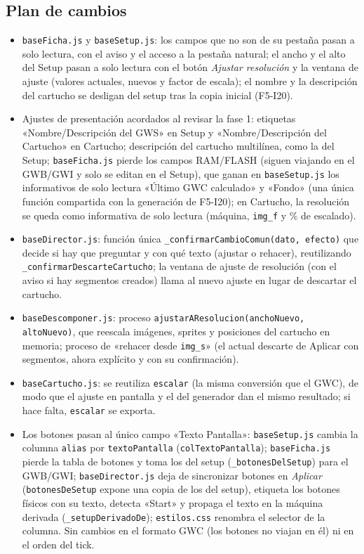 \subsection{Plan de cambios}
\label{sec:F5I21Plan}

\begin{itemize}
	\item \texttt{baseFicha.js} y \texttt{baseSetup.js}: los campos que no son de su pestaña pasan a solo lectura, con el aviso y el acceso a la pestaña natural; el ancho y el alto del Setup pasan a solo lectura con el botón \emph{Ajustar resolución} y la ventana de ajuste (valores actuales, nuevos y factor de escala); el nombre y la descripción del cartucho se desligan del setup tras la copia inicial (F5-I20).
	\item Ajustes de presentación acordados al revisar la fase 1: etiquetas «Nombre/Descripción del GWS» en Setup y «Nombre/Descripción del Cartucho» en Cartucho; descripción del cartucho multilínea, como la del Setup; \texttt{baseFicha.js} pierde los campos RAM/FLASH (siguen viajando en el GWB/GWI y solo se editan en el Setup), que ganan en \texttt{baseSetup.js} los informativos de solo lectura «Último GWC calculado» y «Fondo» (una única función compartida con la generación de F5-I20); en Cartucho, la resolución se queda como informativa de solo lectura (máquina, \texttt{img\_f} y \% de escalado).
	\item \texttt{baseDirector.js}: función única \texttt{\_confirmarCambioComun(dato, efecto)} que decide si hay que preguntar y con qué texto (ajustar o rehacer), reutilizando \texttt{\_confirmarDescarteCartucho}; la ventana de ajuste de resolución (con el aviso si hay segmentos creados) llama al nuevo ajuste en lugar de descartar el cartucho.
	\item \texttt{baseDescomponer.js}: proceso \texttt{ajustarAResolucion(anchoNuevo, altoNuevo)}, que reescala imágenes, sprites y posiciones del cartucho en memoria; proceso de «rehacer desde \texttt{img\_s}» (el actual descarte de Aplicar con segmentos, ahora explícito y con su confirmación).
	\item \texttt{baseCartucho.js}: se reutiliza \texttt{escalar} (la misma conversión que el GWC), de modo que el ajuste en pantalla y el del generador dan el mismo resultado; si hace falta, \texttt{escalar} se exporta.
	\item Los botones pasan al único campo «Texto Pantalla»: \texttt{baseSetup.js} cambia la columna \texttt{alias} por \texttt{textoPantalla} (\texttt{colTextoPantalla}); \texttt{baseFicha.js} pierde la tabla de botones y toma los del setup (\texttt{\_botonesDelSetup}) para el GWB/GWI; \texttt{baseDirector.js} deja de sincronizar botones en \emph{Aplicar} (\texttt{botonesDeSetup} expone una copia de los del setup), etiqueta los botones físicos con su texto, detecta «Start» y propaga el texto en la máquina derivada (\texttt{\_setupDerivadoDe}); \texttt{estilos.css} renombra el selector de la columna. Sin cambios en el formato GWC (los botones no viajan en él) ni en el orden del tick.
\end{itemize}

